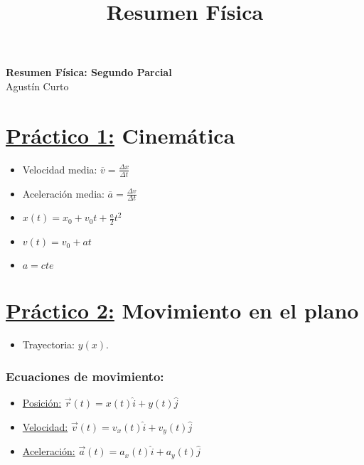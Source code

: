\documentclass[12pt,a4paper]{article}
\title{Resumen Física}
\begin{document}
	\begin{center}
		\Huge \textbf{Resumen Física: Segundo Parcial} \\
		\large Agustín Curto
	\end{center}

	\section*{\underline{Práctico 1:} Cinemática}
		\begin{multicols}{2}
			\begin{itemize}
				\item Velocidad media: $\overline{v} = \frac{\Delta x}{\Delta t}$
				\item Aceleración media: $\overline{a} = \frac{\Delta v}{\Delta t}$
			\end{itemize}
		\end{multicols}
		\begin{multicols}{3}
			\begin{itemize}
				\item $x(t) = x_{0} + v_{0} t + \frac{a}{2} t^{2}$
				\item $v(t) = v_{0} + at$
				\item $a = cte$
			\end{itemize}
		\end{multicols}

	\section*{\underline{Práctico 2:} Movimiento en el plano}
		\begin{itemize}
			\item Trayectoria: $y(x)$.
		\end{itemize}

		\subsubsection*{Ecuaciones de movimiento:}
			\begin{itemize}
				\item \underline{Posición:} $\vec{r}(t) = x(t) \hat{i} + y(t) \hat{j}$
				\item \underline{Velocidad:} $\vec{v}(t) = v_{x}(t) \hat{i} + v_{y}(t) \hat{j}$
				\item \underline{Aceleración:} $\vec{a}(t) = a_{x}(t) \hat{i} + a_{y}(t) \hat{j}$
			\end{itemize}
\end{document}

